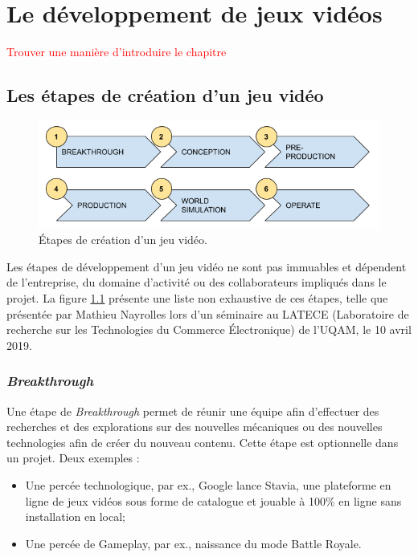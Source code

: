 \chapter{Le développement de jeux vidéos}
 \textcolor{red}{Trouver une manière d'introduire le chapitre}

\section{Les étapes de création d'un jeu vid\'eo}
\begin{figure}[H]
    \centering
    \includegraphics[width=14cm]{10_img/production_stages.png} 
    \caption{Étapes de création d'un jeu vidéo.}
    \label{fig.etapes}
\end{figure}

Les étapes de développement d'un jeu vidéo ne sont pas immuables et dépendent de l'entreprise, du domaine d'activité ou des collaborateurs impliqués dans le projet. La figure \ref{fig.etapes} présente une liste non exhaustive de ces étapes, telle que présentée par Mathieu Nayrolles lors d’un séminaire au LATECE (Laboratoire de recherche sur les Technologies du Commerce Électronique) de l’UQAM, le 10 avril 2019.



\subsection{\emph{Breakthrough}}

Une étape de \emph{Breakthrough} permet de réunir une équipe afin d'effectuer des recherches et des explorations sur des nouvelles mécaniques ou des nouvelles technologies afin de créer du nouveau contenu. Cette étape est optionnelle dans un projet.
Deux exemples :
\begin{itemize}
    \item Une percée technologique, par ex., Google lance Stavia, une plateforme en ligne de jeux vidéos sous forme de catalogue et jouable à 100\% en ligne sans installation en local;
    \item Une percée de Gameplay, par ex., naissance du mode Battle Royale.
\end{itemize}

